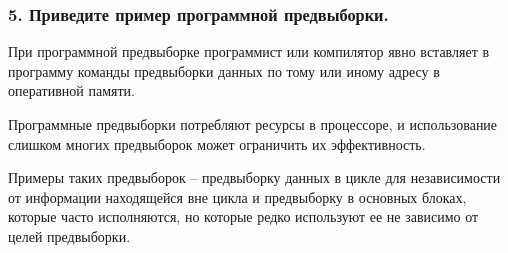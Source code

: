 \subsubsection{\textbf{5. Приведите пример программной предвыборки.}}

При программной предвыборке программист или компилятор явно вставляет в программу команды предвыборки данных по тому или иному адресу в оперативной памяти. 

Программные предвыборки потребляют ресурсы в процессоре, и использование слишком многих предвыборок может ограничить их эффективность. 

Примеры таких предвыборок -- предвыборку данных в цикле для независимости от информации находящейся вне цикла и предвыборку в основных блоках, которые часто исполняются, но которые редко используют ее не зависимо от целей предвыборки.
